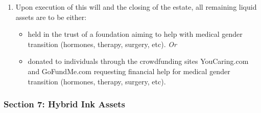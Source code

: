 \begin{enumerate}
\def\labelenumi{\arabic{enumi}.}
\tightlist
\item
  Upon execution of this will and the closing of the estate, all remaining liquid assets are to be either:

  \begin{itemize}
  \tightlist
  \item
    held in the trust of a foundation aiming to help with medical gender transition (hormones, therapy, surgery, etc). \emph{Or}
  \item
    donated to individuals through the crowdfunding sites YouCaring.com and GoFundMe.com requesting financial help for medical gender transition (hormones, therapy, surgery, etc).
  \end{itemize}
\end{enumerate}

\hypertarget{section-7-hybrid-ink-assets}{%
\subsubsection*{Section 7: Hybrid Ink Assets}\label{section-7-hybrid-ink-assets}}

